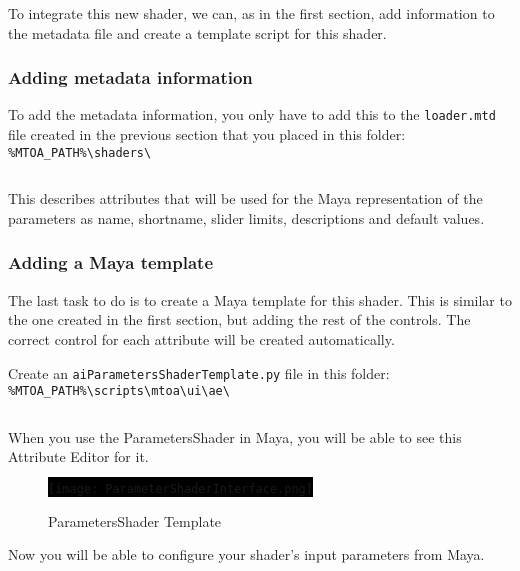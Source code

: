 To integrate this new shader, we can, as in the first section, add information to the metadata file and create a template script for this shader.

\subsubsection{Adding metadata information}

To add the metadata information, you only have to add this to the \texttt{loader.mtd} file created in the previous section that you placed in this folder:\\
\verb|%MTOA_PATH%\shaders\|\\

\inputminted[mathescape,
linenos,
numbersep=5pt,
frame=lines,
framesep=2mm,
baselinestretch=1,
fontsize=\footnotesize,
tabsize=3,
label=loader.mtd,
firstline=25,
firstnumber=25]
{mtd}{loader2.mtd}

This describes attributes that will be used for the Maya representation of the parameters as name, shortname, slider limits, descriptions and default values.

\subsubsection{Adding a Maya template}

The last task to do is to create a Maya template for this shader. This is similar to the one created in the first section, but adding the rest of the controls. The correct control for each attribute will be created automatically.

Create an \texttt{aiParametersShaderTemplate.py} file in this folder:\\
\verb|%MTOA_PATH%\scripts\mtoa\ui\ae\|\\

\inputminted[mathescape,
linenos,
numbersep=5pt,
frame=lines,
framesep=2mm,
baselinestretch=1,
fontsize=\footnotesize,
tabsize=3,
label=aiParametersShaderTemplate.py]
{python}{aiParametersShaderTemplate.py}

When you use the ParametersShader in Maya, you will be able to see this Attribute Editor for it.

\begin{figure}[H]
\centering
\colorbox{black}{\texttt{[image: ParameterShaderInterface.png]}}
\caption{ParametersShader Template}
\label{ParametersShaderTemplate}
\end{figure}

Now you will be able to configure your shader's input parameters from Maya.
